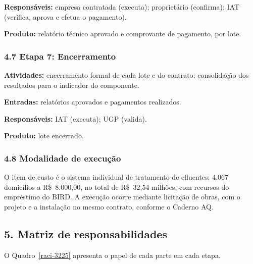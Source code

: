 \textbf{Responsáveis:} empresa contratada (executa); proprietário (confirma); IAT (verifica, aprova e efetua o pagamento).

\textbf{Produto:} relatório técnico aprovado e comprovante de pagamento, por lote.


\subsubsection*{4.7 Etapa 7: Encerramento}

\textbf{Atividades:} encerramento formal de cada lote e do contrato; consolidação dos resultados para o indicador do componente.

\textbf{Entradas:} relatórios aprovados e pagamentos realizados.

\textbf{Responsáveis:} IAT (executa); UGP (valida).

\textbf{Produto:} lote encerrado.

\subsubsection*{4.8 Modalidade de execução}

O item de custo é o sistema individual de tratamento de efluentes: 4.067 domicílios a R\$~8.000,00, no total de R\$~32,54 milhões, com recursos do empréstimo do BIRD. A execução ocorre mediante licitação de obras, com o projeto e a instalação no mesmo contrato, conforme o Caderno AQ.


{}
\subsection*{5. Matriz de responsabilidades}

O Quadro~\ref{raci-3225} apresenta o papel de cada parte em cada etapa.

